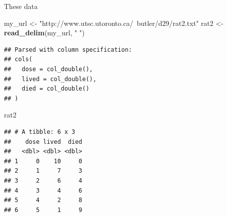 \documentclass[
  ignorenonframetext,
]{beamer}
\newenvironment{Shaded}{\begin{snugshade}}{\end{snugshade}}
\newcommand{\KeywordTok}[1]{\textcolor[rgb]{0.13,0.29,0.53}{\textbf{#1}}}
\newcommand{\NormalTok}[1]{#1}
\newcommand{\StringTok}[1]{\textcolor[rgb]{0.31,0.60,0.02}{#1}}
\begin{document}
\begin{frame}[fragile]{These data}
\protect\hypertarget{these-data}{}

\footnotesize

\begin{Shaded}
\begin{Highlighting}[]
\NormalTok{my_url <-}\StringTok{ "http://www.utsc.utoronto.ca/~butler/d29/rat2.txt"}
\NormalTok{rat2 <-}\StringTok{ }\KeywordTok{read_delim}\NormalTok{(my_url, }\StringTok{" "}\NormalTok{)}
\end{Highlighting}
\end{Shaded}

\begin{verbatim}
## Parsed with column specification:
## cols(
##   dose = col_double(),
##   lived = col_double(),
##   died = col_double()
## )
\end{verbatim}

\begin{Shaded}
\begin{Highlighting}[]
\NormalTok{rat2}
\end{Highlighting}
\end{Shaded}

\begin{verbatim}
## # A tibble: 6 x 3
##    dose lived  died
##   <dbl> <dbl> <dbl>
## 1     0    10     0
## 2     1     7     3
## 3     2     6     4
## 4     3     4     6
## 5     4     2     8
## 6     5     1     9
\end{verbatim}

\normalsize

\end{frame}
\end{document}
